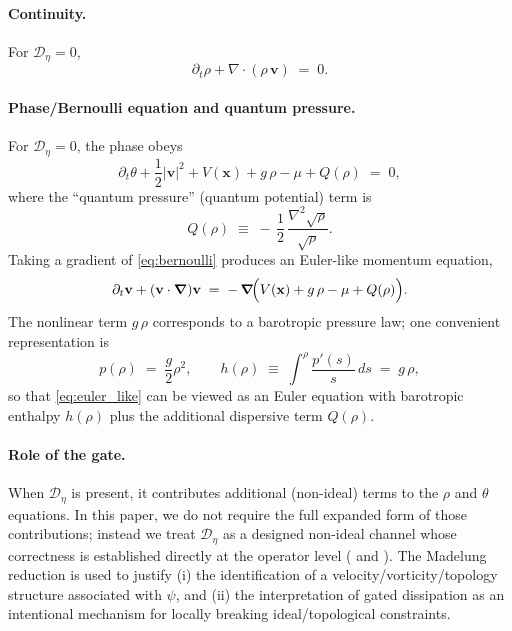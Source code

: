 \documentclass[11pt]{article}
\theoremstyle{plain}
\theoremstyle{definition}
\theoremstyle{remark}
\newcommand{\diver}{\nabla\cdot}
\newcommand{\vfield}{\mathbf{v}}
\begin{document}
\paragraph{Continuity.}
For $\mathcal{D}_\eta=0$,
\begin{equation}\label{eq:continuity}
  \partial_t \rho + \diver(\rho\,\vfield) \;=\; 0.
\end{equation}

\paragraph{Phase/Bernoulli equation and quantum pressure.}
For $\mathcal{D}_\eta=0$, the phase obeys
\begin{equation}\label{eq:bernoulli}
  \partial_t \theta
  + \frac{1}{2}|\vfield|^2
  + V(\mathbf{x})
  + g\,\rho
  - \mu
  + Q(\rho)
  \;=\; 0,
\end{equation}
where the ``quantum pressure'' (quantum potential) term is
\begin{equation}\label{eq:quantum_pressure}
  Q(\rho) \;\equiv\; -\,\frac{1}{2}\,\frac{\nabla^2\sqrt{\rho}}{\sqrt{\rho}}.
\end{equation}
Taking a gradient of \eqref{eq:bernoulli} produces an Euler-like momentum equation,
\begin{equation}\label{eq:euler_like}
  \partial_t \vfield + (\vfield\cdot\grad)\vfield
  \;=\;
  -\,\grad\!\Big( V(\mathbf{x}) + g\,\rho - \mu + Q(\rho)\Big).
\end{equation}
The nonlinear term $g\,\rho$ corresponds to a barotropic pressure law; one convenient representation is
\begin{equation}\label{eq:barotropic_pressure}
  p(\rho) \;=\; \frac{g}{2}\rho^2,
  \qquad
  h(\rho) \;\equiv\; \int^\rho \frac{p'(s)}{s}\,ds \;=\; g\,\rho,
\end{equation}
so that \eqref{eq:euler_like} can be viewed as an Euler equation with barotropic enthalpy $h(\rho)$ plus the additional dispersive term $Q(\rho)$.

\paragraph{Role of the gate.}
When $\mathcal{D}_\eta$ is present, it contributes additional (non-ideal) terms to the $\rho$ and $\theta$ equations. In this paper, we do not require the full expanded form of those contributions; instead we treat $\mathcal{D}_\eta$ as a designed non-ideal channel whose correctness is established directly at the operator level ( and ). The Madelung reduction is used to justify (i) the identification of a velocity/vorticity/topology structure associated with $\psi$, and (ii) the interpretation of gated dissipation as an intentional mechanism for locally breaking ideal/topological constraints.
\end{document}
